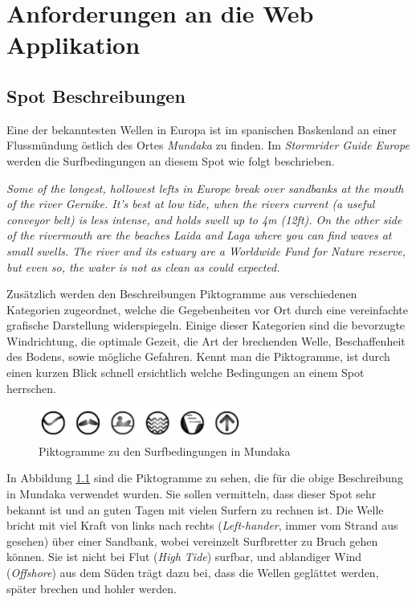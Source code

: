 
\chapter{Anforderungen an die Web Applikation}

\section{Spot Beschreibungen}

Eine der bekanntesten Wellen in Europa ist im spanischen Baskenland an
einer Fluss\-mündung östlich des Ortes \textit{Mundaka} zu finden. Im
\textit{Stormrider Guide Europe} \cite[S.180]{storm_europe_1998}
werden die Surfbedingungen an diesem Spot wie folgt beschrieben.

\textit{Some of the longest, hollowest lefts in Europe break over
  sandbanks at the mouth of the river Gernike. It's best at low tide,
  when the rivers current (a useful conveyor belt) is less intense,
  and holds swell up to 4m (12ft). On the other side of the rivermouth
  are the beaches Laida and Laga where you can find waves at small
  swells. The river and its estuary are a Worldwide Fund for Nature
  reserve, but even so, the water is not as clean as could expected.
}

Zusätzlich werden den Beschreibungen Piktogramme aus verschiedenen
Kategorien zugeordnet, welche die Gegebenheiten vor Ort durch eine
vereinfachte grafische Darstellung widerspiegeln. Einige dieser
Kategorien sind die bevorzugte Windrichtung, die optimale Gezeit, die
Art der brechenden Welle, Beschaffenheit des Bodens, sowie mögliche
Gefahren. Kennt man die Piktogramme, ist durch einen kurzen Blick
schnell ersichtlich welche Bedingungen an einem Spot herrschen.

\begin{figure}[h]
  \begin{center}
    \includegraphics[height=40px]{bilder/mundaka-conditions}
    \caption{Piktogramme zu den Surfbedingungen in Mundaka}
    \label{piktogramm}
  \end{center}
\end{figure}

In Abbildung \ref{piktogramm} sind die Piktogramme zu sehen, die für
die obige Beschreibung in Mundaka verwendet wurden. Sie sollen
vermitteln, dass dieser Spot sehr bekannt ist und an guten Tagen mit
vielen Surfern zu rechnen ist. Die Welle bricht mit viel Kraft von
links nach rechts (\textit{Left-hander}, immer vom Strand aus gesehen)
über einer Sandbank, wobei vereinzelt Surfbretter zu Bruch gehen
können.  Sie ist nicht bei Flut (\textit{High Tide}) surfbar, und
ablandiger Wind (\textit{Offshore}) aus dem Süden trägt dazu bei, dass
die Wellen geglättet werden, später brechen und hohler werden.

